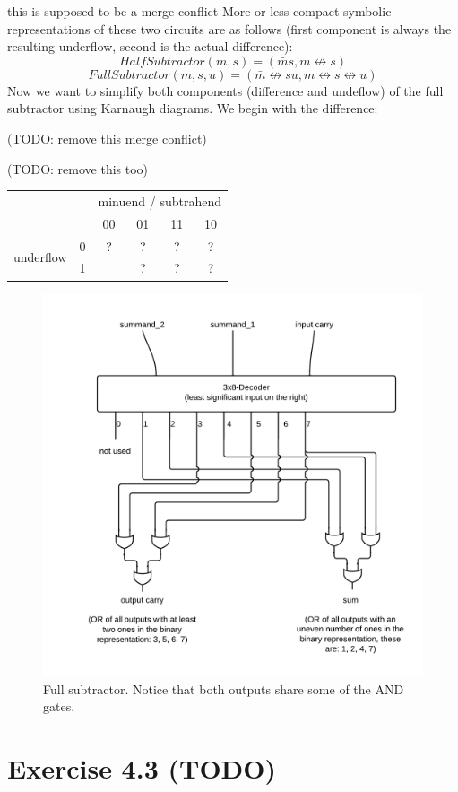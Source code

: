 \documentclass[10pt,a4paper]{scrartcl}
\newcommand{\subExercise}[1]{\vspace{0.5em} \noindent{\bf #1)}}
\begin{document}
this is supposed to be a merge conflict
\subExercise{b} 
More or less compact symbolic representations 
of these two circuits are as follows 
(first component is always the resulting underflow, 
 second is the actual difference):
\[
  HalfSubtractor(m,s) = (\bar m s, m \not\leftrightarrow s)
\]
\[
  FullSubtractor(m,s,u) = 
    (\bar m \not\leftrightarrow su, 
     m \not\leftrightarrow s \not\leftrightarrow u
    )
\]
\subExercise{c} 
Now we want to simplify both components (difference and undeflow) 
of the full subtractor using Karnaugh diagrams. We begin with the
difference:

(TODO: remove this merge conflict)

(TODO: remove this too)
\vspace{0.5em}
\begin{tabular}{|c c|c c c c|}
  \hline 
    & & \multicolumn{4}{c|}{minuend / subtrahend} \\
    & & 00 & 01 & 11 & 10 \\
  \hline
    \multirow{2}{*}{underflow} & 0 & ? & ? & ? & ? \\
                               & 1 & \cellcolor{red}{?} & ? & ? & ? \\
  \hline
\end{tabular}
 
\subExercise{d}
\vspace{1em}
\begin{figure}[h]
  \centering\includegraphics[width=0.6\linewidth]{images/fullAdder.png}
  \caption{Full subtractor. Notice that both outputs share some of the AND gates.}
\end{figure}
\vspace{1em}


\section*{Exercise 4.3 (TODO)}
\subExercise{a}
\subExercise{b}
\end{document}
